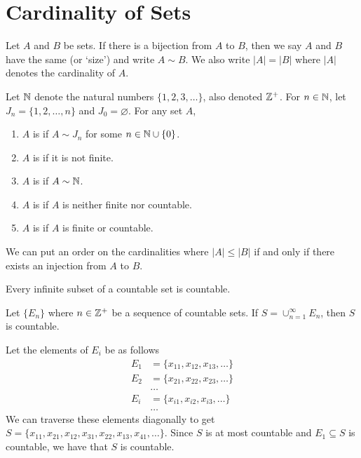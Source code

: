 \documentclass{mathnotes}
\begin{document}
\section*{Cardinality of Sets}

\begin{defi}
  Let $A$ and $B$ be sets. If there is a bijection from $A$ to $B$, then we say
  $A$ and $B$ have the same  (or `size') and write $A\sim
  B$.  We also write $|A|=|B|$ where $|A|$ denotes the cardinality of $A$.
\end{defi}

\begin{defi}
  Let $\mathbb{N}$ denote the natural numbers $\{1,2,3,\ldots\}$, also denoted
  $\mathbb{Z}^+$. For $n\in\mathbb{N}$, let $J_n=\{1,2,\ldots,n\}$ and $J_0=\varnothing$. For
  any set $A$,
  \begin{enumerate}
    \item $A$ is  if $A\sim J_n$ for some $n\in\mathbb{N}\cup\{0\}$.
    \item $A$ is  if it is not finite.
    \item $A$ is  if $A\sim\mathbb{N}$.
    \item $A$ is  if $A$ is neither finite nor countable.
    \item $A$ is  if $A$ is finite or countable.
  \end{enumerate}
\end{defi}

\begin{note}
  We can put an order on the cardinalities where $|A|\le|B|$ if and only if
  there exists an injection from $A$ to $B$.
\end{note}

\begin{prop}
  Every infinite subset of a countable set is countable.
\end{prop}

\begin{prop}
  Let $\{E_n\}$ where $n\in\mathbb{Z}^+$ be a sequence of countable sets. If
  $S=\cup_{n=1}^\infty E_n$, then $S$ is countable.
\end{prop}

\begin{pf}
  Let the elements of $E_i$ be as follows
  \begin{align*}
    E_1&=\{x_{11},x_{12},x_{13},\ldots\}\\
    E_2&=\{x_{21},x_{22},x_{23},\ldots\}\\
       &\ldots\\
    E_i&=\{x_{i1},x_{i2},x_{i3},\ldots\}\\
       &\ldots
  \end{align*}
  We can traverse these elements diagonally to get
  $S=\{x_{11},x_{21},x_{12},x_{31},x_{22},x_{13},x_{41},\ldots\}$. Since $S$ is
  at most countable and $E_1\subseteq S$ is countable, we have that $S$ is
  countable.
\end{pf}
\end{document}
